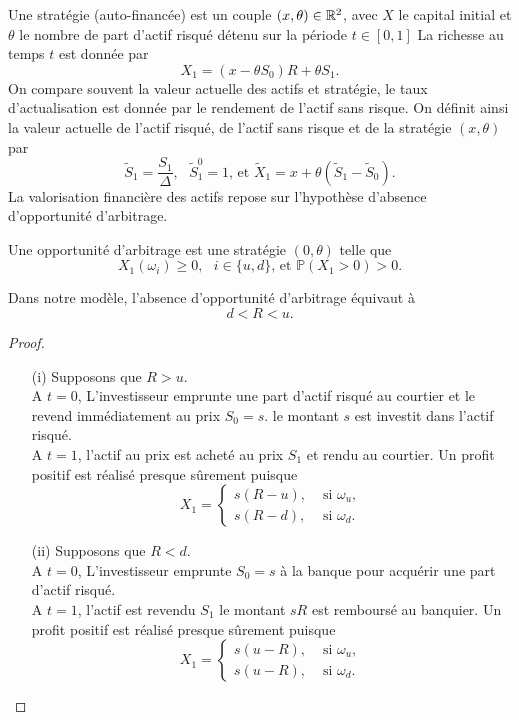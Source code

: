 \noindent Une stratégie (auto-financée) est un couple $(x,\theta)\in \mathbb{R}^2$, avec 
$X$ le capital initial et $\theta$ le nombre de part d'actif risqué détenu sur la période $t\in[0, 1]$ La richesse au temps $t$ est donnée par 
$$
X_1 = (x-\theta S_0)R+ \theta S_1.
$$
On compare souvent la valeur actuelle des actifs et stratégie, le taux d'actualisation est donnée par le rendement de l'actif sans risque. On définit ainsi la valeur actuelle de l'actif risqué, de l'actif sans risque et de la stratégie $(x,\theta)$ par 
$$
\tilde{S}_1 = \frac{S_1}{\Delta},\text{ }\tilde{S}_1^0 = 1\text{, et }\tilde{X}_1 = x + \theta(\tilde{S}_1 - \tilde{S}_0).
$$
La valorisation financière des actifs repose sur l'hypothèse d'absence d'opportunité d'arbitrage. 

\begin{definition}\label{def:opportunite_arbitrage}
Une opportunité d'arbitrage est une stratégie $(0,\theta)$ telle que 
$$
X_1(\omega_i)\geq0,\text{ }i\in\{u,d\}\text{, et }\mathbb{P}(X_1>0)>0.
$$

\end{definition}
\begin{prop}
Dans notre modèle, l'absence d'opportunité d'arbitrage équivaut à 
$$
d<R<u.
$$
\end{prop}
\begin{proof}
\begin{itemize}
    \item[(i)] Supposons que $R>u$. \\

    A $t=0$, L'investisseur emprunte une part d'actif risqué au courtier et le revend immédiatement au prix $S_0 = s$. le montant $s$ est investit dans l'actif risqué.\\

    A $t=1$, l'actif au prix est acheté au prix $S_1$ et rendu au courtier. Un profit positif est réalisé presque sûrement puisque
    $$
    X_1 = \begin{cases}
    s(R-u),&\text{ si }\omega_u,\\
    s(R-d),&\text{ si }\omega_d.
    \end{cases}
    $$ 
    \item[(ii)] Supposons que $R<d$.\\

    A $t=0$, L'investisseur emprunte $S_0 = s$ à la banque pour acquérir une part d'actif risqué.\\ 

    A $t=1$, l'actif est revendu $S_1$ le montant $sR$ est remboursé au banquier. Un profit positif est réalisé presque sûrement puisque
    $$
    X_1 = \begin{cases}
    s(u-R),&\text{ si }\omega_u,\\
    s(u-R),&\text{ si }\omega_d.
    \end{cases}
    $$
\end{itemize}
\end{proof}
